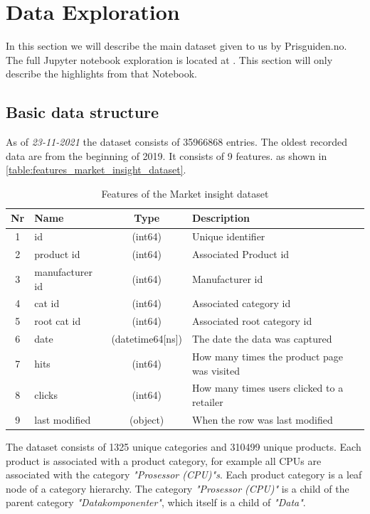 \section{Data Exploration}
\label{section:Architecture:DataExploration}
In this section we will describe the main dataset given to us 
by Prisguiden.no. The full Jupyter notebook exploration
is located at \cite{notebook-data-exploration}. This section will only
describe the highlights from that Notebook.

\subsection{Basic data structure}
As of \textit{23-11-2021} the dataset consists of 35966868 entries.
The oldest recorded data are from the beginning of 2019.
It consists of 9 features.
as shown in \autoref{table:features_market_insight_dataset}.
\begin{table}[htbp]
  \centering
  \caption{Features of the Market insight dataset}
  \label{table:features_market_insight_dataset}
  \begin{tabular}{|c|l|c|l|}\hline\hline
   Nr & Name & Type & Description \\ \hline 
   1 &id &(int64) & Unique identifier \\ \hline
  2 & product id & (int64) & Associated Product id \\ \hline
  3 & manufacturer id & (int64) & Manufacturer id \\ \hline
  4 &cat id & (int64) & Associated category id \\ \hline
  5 & root cat id & (int64) & Associated root category id \\ \hline
  6 & date & (datetime64[ns]) & The date the data was captured \\ \hline
  7 & hits & (int64) & How many times the product page was visited \\ \hline
  8 &clicks & (int64) & How many times users clicked to a retailer \\ \hline
  9 & last modified & (object) & When the row was last modified \\ \hline
  \end{tabular}
\end{table}

The dataset consists of 1325 unique categories and 310499 unique products.
Each product is associated with a product category, for example
all CPUs are associated with the category
\textit{"Prosessor (CPU)"s}.
Each product category is a leaf node of a category hierarchy.
The category \textit{"Prosessor (CPU)"} is a child of the parent category 
\textit{"Datakomponenter"}, which itself is a child of \textit{"Data"}.

